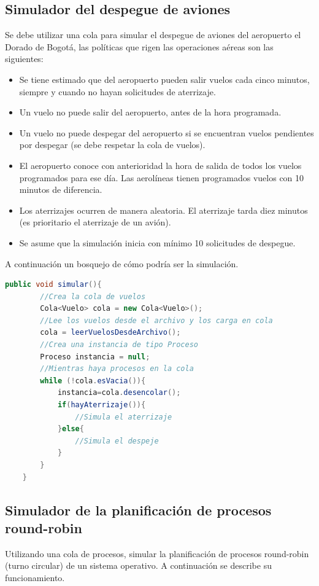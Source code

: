 \subsection{Simulador del despegue de aviones}
Se debe utilizar una cola para simular el despegue de aviones del aeropuerto el Dorado de Bogotá, las políticas que rigen las operaciones aéreas son las siguientes:
\begin{itemize}
\item Se tiene estimado que del aeropuerto pueden salir vuelos cada cinco minutos, siempre y cuando no hayan solicitudes de aterrizaje.
\item Un vuelo no puede salir del aeropuerto, antes de la hora programada.
\item Un vuelo no puede despegar del aeropuerto si se encuentran vuelos pendientes por despegar (se debe respetar la cola de vuelos).
\item El aeropuerto conoce con anterioridad la hora de salida de todos los vuelos programados para ese día. Las aerolíneas tienen programados vuelos con 10 minutos de diferencia.
\item Los aterrizajes ocurren de manera aleatoria. El aterrizaje tarda diez minutos (es prioritario el aterrizaje de un avión).
\item Se asume que la simulación inicia con mínimo 10 solicitudes de despegue.
\end{itemize}

A continuación un bosquejo de cómo podría ser la simulación.

\begin{lstlisting}[language=Java]
	public void simular(){
		//Crea la cola de vuelos
		Cola<Vuelo> cola = new Cola<Vuelo>();
		//Lee los vuelos desde el archivo y los carga en cola
		cola = leerVuelosDesdeArchivo();
		//Crea una instancia de tipo Proceso
		Proceso instancia = null;
		//Mientras haya procesos en la cola
	    while (!cola.esVacia()){
			instancia=cola.desencolar();
			if(hayAterrizaje()){
				//Simula el aterrizaje
			}else{
				//Simula el despeje
			}
		}
	}

\end{lstlisting}

\subsection{Simulador de la planificación de procesos round-robin}
Utilizando una cola de procesos, simular la planificación de procesos round-robin (turno circular) de un sistema operativo. A continuación se describe su funcionamiento.

